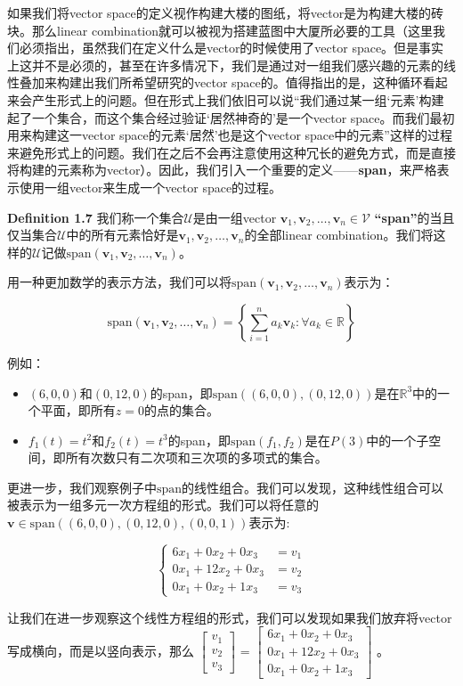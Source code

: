 \documentclass{report}
\def\R{\mathbb{R}}
\def\defb{\begin{tcolorbox} [colback=yellow!20, colframe=orange!80, sharp corners, leftrule={5pt}, rightrule={0pt}, toprule={0pt}, bottomrule={0pt}, left={2pt}, right={2pt}, top={3pt}, bottom={3pt}]}
\def\defe{\end{tcolorbox}}
\def\egb{\begin{tcolorbox} [colback=blue!20, colframe=blue!80, sharp corners, leftrule={5pt}, rightrule={0pt}, toprule={0pt}, bottomrule={0pt}, left={2pt}, right={2pt}, top={3pt}, bottom={3pt}]}
\def\ege{\end{tcolorbox}}
\def\V{\mathcal{V}}
\def\U{\mathcal{U}}
\def\v{\mathbf{v}}
\def\span{\text{span}}
\begin{document}
如果我们将vector space的定义视作构建大楼的图纸，将vector是为构建大楼的砖块。那么linear combination就可以被视为搭建蓝图中大厦所必要的工具（这里我们必须指出，虽然我们在定义什么是vector的时候使用了vector space。但是事实上这并不是必须的，甚至在许多情况下，我们是通过对一组我们感兴趣的元素的线性叠加来构建出我们所希望研究的vector space的。值得指出的是，这种循环看起来会产生形式上的问题。但在形式上我们依旧可以说“我们通过某一组‘元素’构建起了一个集合，而这个集合经过验证‘居然神奇的’是一个vector space。而我们最初用来构建这一vector space的元素‘居然’也是这个vector space中的元素”这样的过程来避免形式上的问题。我们在之后不会再注意使用这种冗长的避免方式，而是直接将构建的元素称为vector）。因此，我们引入一个重要的定义——\textbf{span}，来严格表示使用一组vector来生成一个vector space的过程。

\defb
	\textbf{Definition 1.7}
	我们称一个集合$\U$是由一组vector $\v_1,\v_2,\dots,\v_n \in \V$ \textbf{“span”}的当且仅当集合$\U$中的所有元素恰好是$\v_1,\v_2,\dots,\v_n$的全部linear combination。我们将这样的$\U$记做$\span(\v_1,\v_2,\dots,\v_n)$。

	用一种更加数学的表示方法，我们可以将$\span(\v_1,\v_2,\dots,\v_n)$表示为：

	$$ \span(\v_1,\v_2,\dots,\v_n) = \left\{ \sum_{i=1}^{n} a_k \v_k : \forall a_k \in \R \right\} $$
\defe

\egb
例如：

\begin{itemize}

\item  $(6,0,0)$和$(0,12,0)$的span，即$\span((6,0,0),(0,12,0))$是在$\R^3$中的一个平面，即所有$z=0$的点的集合。


\item $f_1(t) = t^2$和$f_2(t) = t^3$的span，即$\span(f_1,f_2)$是在$P(3)$中的一个子空间，即所有次数只有二次项和三次项的多项式的集合。

\end{itemize}

\ege 

更进一步，我们观察例子中$\span$的线性组合。我们可以发现，这种线性组合可以被表示为一组多元一次方程组的形式。我们可以将任意的$\v \in \span((6,0,0),(0,12,0),(0,0,1))$表示为:

$$\begin{cases}
	6x_1 + 0x_2 + 0x_3 &= v_1 \\
	0x_1 + 12x_2 + 0x_3 &= v_2 \\
	0x_1 + 0x_2 + 1x_3 &= v_3
\end{cases}$$

让我们在进一步观察这个线性方程组的形式，我们可以发现如果我们放弃将vector写成横向，而是以竖向表示，那么
$ \left[\begin{matrix}
	v_1 \\
	v_2 \\
	v_3
\end{matrix} \right]$ 
=
$ \left[\begin{matrix}
	6x_1 + 0x_2 + 0x_3\\
	0x_1 + 12x_2 + 0x_3\\
	0x_1 + 0x_2 + 1x_3
\end{matrix} \right]$ 
。
\end{document}
